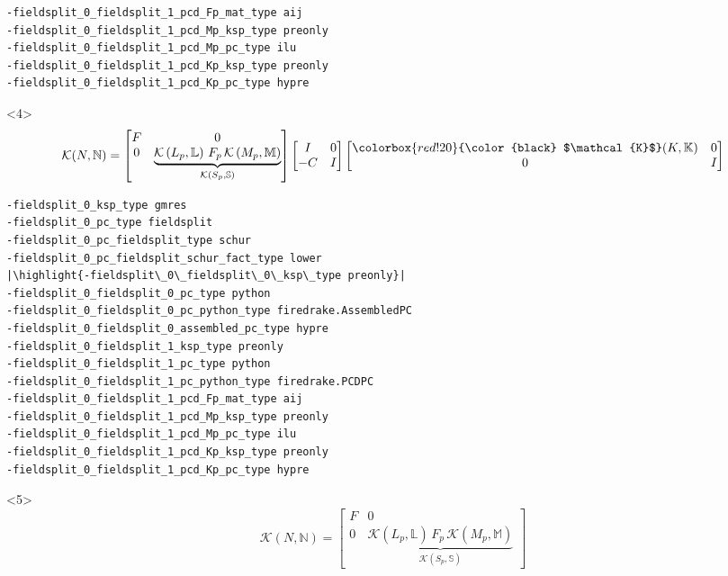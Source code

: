 \documentclass[presentation]{beamer}
\newcommand{\KSP}[2]{\ensuremath{\mathcal{K}\left(#1, \mathbb{#2}\right)}}
\newcommand{\highlight}[1]{\colorbox{red!20}{\color{black} #1}}
\begin{document}
\begin{frame}[fragile]
\begin{onlyenv}
\begin{verbatim}
-fieldsplit_0_fieldsplit_1_pcd_Fp_mat_type aij
-fieldsplit_0_fieldsplit_1_pcd_Mp_ksp_type preonly
-fieldsplit_0_fieldsplit_1_pcd_Mp_pc_type ilu
-fieldsplit_0_fieldsplit_1_pcd_Kp_ksp_type preonly
-fieldsplit_0_fieldsplit_1_pcd_Kp_pc_type hypre
\end{verbatim}
  \end{onlyenv}
  \begin{onlyenv}<4>
    \color{gray}
    \begin{equation*}
      \mathcal{K}(N, \mathbb{N}) = \begin{bmatrix}
        F & 0 \\
        0 & \underbrace{\KSP{L_p}{L}\,F_p \, \KSP{M_p}{M}}_{\KSP{S_p}{S}}
      \end{bmatrix}
      \begin{bmatrix}
        I & 0\\
        -C & I
      \end{bmatrix}
      \begin{bmatrix}
        \highlight{$\mathcal{K}$}(K, \mathbb{K}) & 0 \\
        0 & I
      \end{bmatrix}
    \end{equation*}
\begin{verbatim}
-fieldsplit_0_ksp_type gmres
-fieldsplit_0_pc_type fieldsplit
-fieldsplit_0_pc_fieldsplit_type schur
-fieldsplit_0_pc_fieldsplit_schur_fact_type lower
|\highlight{-fieldsplit\_0\_fieldsplit\_0\_ksp\_type preonly}|
-fieldsplit_0_fieldsplit_0_pc_type python
-fieldsplit_0_fieldsplit_0_pc_python_type firedrake.AssembledPC
-fieldsplit_0_fieldsplit_0_assembled_pc_type hypre
-fieldsplit_0_fieldsplit_1_ksp_type preonly
-fieldsplit_0_fieldsplit_1_pc_type python
-fieldsplit_0_fieldsplit_1_pc_python_type firedrake.PCDPC
-fieldsplit_0_fieldsplit_1_pcd_Fp_mat_type aij
-fieldsplit_0_fieldsplit_1_pcd_Mp_ksp_type preonly
-fieldsplit_0_fieldsplit_1_pcd_Mp_pc_type ilu
-fieldsplit_0_fieldsplit_1_pcd_Kp_ksp_type preonly
-fieldsplit_0_fieldsplit_1_pcd_Kp_pc_type hypre
\end{verbatim}
  \end{onlyenv}
  \begin{onlyenv}<5>
    \color{gray}
    \begin{equation*}
      \mathcal{K}(N, \mathbb{N}) = \begin{bmatrix}
        F & 0 \\
        0 & \underbrace{\KSP{L_p}{L}\,F_p \, \KSP{M_p}{M}}_{\KSP{S_p}{S}}
      \end{bmatrix}

\end{equation*}
\end{onlyenv}
\end{frame}
\end{document}
